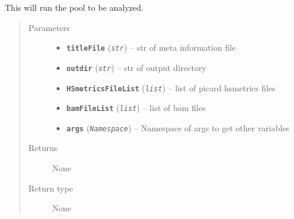 \documentclass[letterpaper,10pt,english]{sphinxmanual}
\begin{document}

\begin{fulllineitems}
\label{iCallSV:iCallSV.iCallSV_dmp_wrapper.RunPerPool}
This will run the pool to be analyzed.
\begin{quote}\begin{description}
\item[{Parameters}] \leavevmode\begin{itemize}
\item {} 
\textbf{\texttt{titleFile}} (\emph{\texttt{str}}) -- str of meta information file

\item {} 
\textbf{\texttt{outdir}} (\emph{\texttt{str}}) -- str of output directory

\item {} 
\textbf{\texttt{HSmetricsFileList}} (\emph{\texttt{list}}) -- list of picard hsmetrics files

\item {} 
\textbf{\texttt{bamFileList}} (\emph{\texttt{list}}) -- list of bam files

\item {} 
\textbf{\texttt{args}} (\emph{\texttt{Namespace}}) -- Namespace of args to get other variables

\end{itemize}

\item[{Returns}] \leavevmode
None

\item[{Return type}] \leavevmode
None

\end{description}\end{quote}

\end{fulllineitems}

\end{document}
